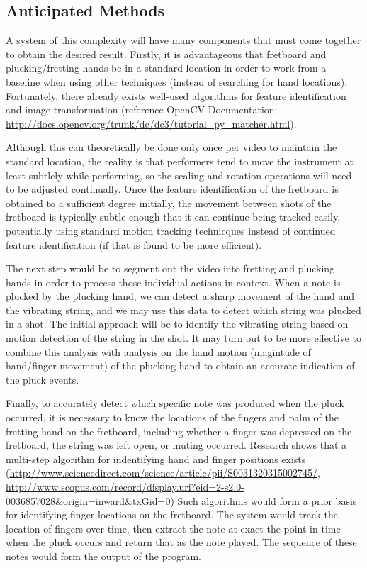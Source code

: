 \subsection{Anticipated Methods}
A system of this complexity will have many components that must come together to obtain the desired result.
Firstly, it is advantageous that fretboard and plucking/fretting hands be in a standard location in order
to work from a baseline when using other techniques (instead of searching for hand locations).
Fortunately, there already exists well-used algorithms for feature identification and image transformation
(reference OpenCV Documentation: \url{http://docs.opencv.org/trunk/dc/dc3/tutorial_py_matcher.html}).
\par
Although this can theoretically be done only once per video to maintain the standard location, 
the reality is that performers tend to move the instrument at least subtlely while performing,
so the scaling and rotation operations will need to be adjusted continually.
Once the feature identification of the fretboard is obtained to a sufficient degree initially,
the movement between shots of the fretboard is typically subtle enough that it can continue being tracked easily,
potentially using standard motion tracking technicques instead of continued feature identification
(if that is found to be more efficient).
\par

The next step would be to segment out the video into fretting and plucking hands in order to process those individual actions in context.
When a note is plucked by the plucking hand, we can detect a sharp movement of the hand and the vibrating string,
and we may use this data to detect which string was plucked in a shot.
The initial approach will be to identify the vibrating string based on motion detection of the string in the shot.
It may turn out to be more effective to combine this analysis with analysis on the hand motion (magintude of hand/finger movement)
of the plucking hand to obtain an accurate indication of the pluck events.
\par

Finally, to accurately detect which specific note was produced when the pluck occurred,
it is necessary to know the locations of the fingers and palm of the fretting hand on the fretboard,
including whether a finger was depressed on the fretboard, the string was left open, or muting occurred.
Research shows that a multi-step algorithm for indentifying hand and finger positions exists
(\url{http://www.sciencedirect.com/science/article/pii/S0031320315002745/}, 
\url{http://www.scopus.com/record/display.uri?eid=2-s2.0-0036857028&origin=inward&txGid=0})
Such algorithms would form a prior basis for identifying finger locations on the fretboard.
The system would track the location of fingers over time,
then extract the note at exact the point in time when the pluck occurs and return that as the note played.
The sequence of these notes would form the output of the program.

